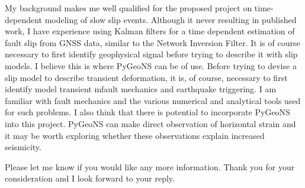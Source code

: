 \documentclass[11pt,a4paper,sans]{moderncv}
\begin{document}
My background makes me well qualified for the proposed project on time-dependent modeling of slow slip events. Although it never resulting in published work, I have experience using Kalman filters for a time dependent estimation of fault slip from GNSS data, similar to the Network Inversion Filter. It is of course necessary to first identify geophysical signal before trying to describe it with slip models. I believe this is where PyGeoNS can be of use. Before trying to devise a slip model to describe transient deformation, it is, of course, necessary to first identify model transient mfault mechanics and earthquake triggering. I am familiar with fault mechanics and the various numerical and analytical tools used for such problems. I also think that there is potential to incorporate PyGeoNS into this project. PyGeoNS can make direct observation of horizontal strain and it may be worth exploring whether these observations explain increased seismicity. 

Please let me know if you would like any more information. Thank you for your consideration and I look forward to your reply.                                              

\makeletterclosing
\end{document}
